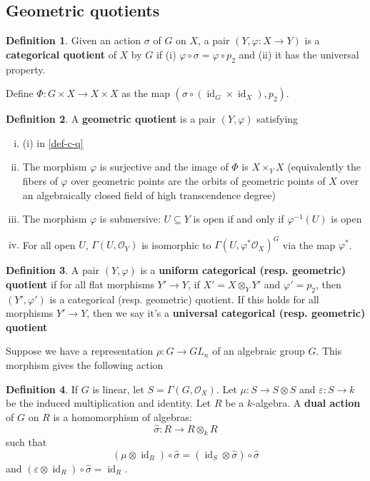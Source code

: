 \documentclass[12pt]{report}
\theoremstyle{remark}
\theoremstyle{definition}
\newtheorem{definition}{Definition}[section]
\newcommand{\ve}[0]{\varepsilon}
\newcommand{\s}[0]{\sigma}
\newcommand{\id}[0]{\operatorname{id}}
\begin{document}
    \subsection{Geometric quotients}
    \begin{definition}\label{def-c-q}
        Given an action $\s$ of $G$ on $X$, a pair $(Y,\varphi:X\to Y)$ is a \textbf{categorical quotient} of $X$ by $G$ if (i) $\varphi\circ\s=\varphi\circ p_2$ and (ii) it has the universal property.
    \end{definition}
    Define $\Phi:G\times X\to X\times X$ as the map $(\s\circ (\id_G\times \id_X), p_2)$.
    \begin{definition}
        A \textbf{geometric quotient} is a pair $(Y, \varphi)$ satisfying 
        \begin{enumerate}[(i)]
            \item (i) in \autoref{def-c-q}
            \item The morphism $\varphi$ is surjective and the image of $\Phi$ is $X\times_Y X$ (equivalently the fibers of $\varphi$ over geometric points are the orbits of geometric points of $X$ over an algebraically closed field of high transcendence degree)
            \item The morphism $\varphi$ is submersive: $U\subseteq Y$ is open if and only if $\varphi^{-1}(U)$ is open
            \item For all open $U$, $\Gamma(U,\mathcal O_Y)$ is isomorphic to $\Gamma(U, \varphi^*\mathcal O_X)^G$ via the map $\varphi^*$.
        \end{enumerate}
    \end{definition}
    \begin{definition}
        A pair $(Y, \varphi)$ is a \textbf{uniform categorical (resp. geometric) quotient} if for all flat morphisms $Y'\to Y$, if $X'=X\otimes_Y Y'$ and $\varphi'=p_2$, then $(Y', \varphi')$ is a categorical (resp. geometric) quotient. If this holds for all morphisms $Y'\to Y$, then we say it's a \textbf{universal categorical (resp. geometric) quotient}
    \end{definition}
    Suppose we have a representation $\rho:G\to GL_n$ of an algebraic group $G$. This morphism gives the following action
    \begin{definition}
        If $G$ is linear, let $S=\Gamma(G, \mathcal O_X)$. Let $\mu:S\to S\otimes S$ and $\ve:S\to k$ be the induced multiplication and identity. Let $R$ be a $k$-algebra. A \textbf{dual action} of $G$ on $R$ is a homomorphism of algebras:
        \[\hat{\s}:R\to R\otimes_k R\]
        such that 
        \[(\mu\otimes\id_R)\circ\hat\s=(\id_S\otimes\hat\s)\circ\hat\s\]
        and $(\ve\otimes \id_R)\circ\hat\s=\id_R$.
    \end{definition}
\end{document}
